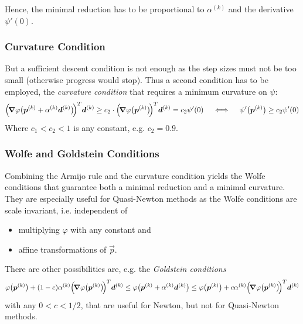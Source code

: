 				Hence, the minimal reduction has to be proportional to \(\alpha^{(k)}\) and the derivative \( \psi'(0) \).

			\subsubsection{Curvature Condition}
				But a sufficient descent condition is not enough as the step sizes must not be too small (otherwise progress would stop). Thus a second condition has to be employed, the \emph{curvature condition} that requires a minimum curvature on \(\psi\):
				\begin{align*}
					\Big(\!\grad{\varphi}\big(\bm{p}^{(k)} + \alpha^{(k)} \bm{d}^{(k)}\big)\!\Big)^T \bm{d}^{(k)} \geq c_2 \cdot \Big(\! \grad{\varphi}\big(\bm{p}^{(k)}\big) \!\Big)^T \bm{d}^{(k)} = c_2 \psi'(0) \quad\iff\quad \psi'\big(\bm{p}^{(k)}\big) \geq c_2 \psi'(0)
				\end{align*}
				Where \( c_1 < c_2 < 1 \) is any constant, e.g. \( c_2 = 0.9 \).

			\subsubsection{Wolfe and Goldstein Conditions}
				Combining the Armijo rule and the curvature condition yields the Wolfe conditions that guarantee both a minimal reduction and a minimal curvature. They are especially useful for Quasi-Newton methods as the Wolfe conditions are scale invariant, i.e. independent of
				\begin{itemize}
					\item multiplying \(\varphi\) with any constant and
					\item affine transformations of \(\vec{p}\).
				\end{itemize}

				There are other possibilities are, e.g. the \emph{Goldstein conditions}
				\begin{align*}
					\varphi\big(\bm{p}^{(k)}\big) + (1 - c) \alpha^{(k)} \Big(\! \grad{\varphi}\big(\bm{p}^{(k)}\big) \!\Big)^T \bm{d}^{(k)}
					\leq \varphi\big( \bm{p}^{(k)} + \alpha^{(k)} \bm{d}^{(k)} \big)
					\leq \varphi\big( \bm{p}^{(k)} \big) + c \alpha^{(k)} \Big(\! \grad{\varphi}\big(\bm{p}^{(k)}\big) \!\Big)^T \bm{d}^{(k)}
				\end{align*}
				with any \( 0 < c < 1/2 \), that are useful for Newton, but not for Quasi-Newton methods.

